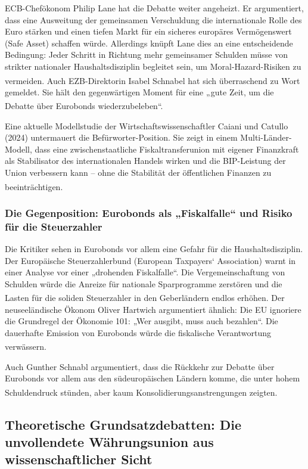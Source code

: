 \documentclass[12pt,a4paper]{article}
\newcommand{\footcite}[1]{\textsuperscript{\cite{#1}}}
\begin{document}
	ECB-Chefökonom Philip Lane hat die Debatte weiter angeheizt. Er argumentiert, dass eine Ausweitung der gemeinsamen Verschuldung die internationale Rolle des Euro stärken und einen tiefen Markt für ein sicheres europäres Vermögenswert (Safe Asset) schaffen würde. Allerdings knüpft Lane dies an eine entscheidende Bedingung: Jeder Schritt in Richtung mehr gemeinsamer Schulden müsse von strikter nationaler Haushaltsdisziplin begleitet sein, um Moral-Hazard-Risiken zu vermeiden.\footcite{Lane2026} Auch EZB-Direktorin Isabel Schnabel hat sich überraschend zu Wort gemeldet. Sie hält den gegenwärtigen Moment für eine „gute Zeit, um die Debatte über Eurobonds wiederzubeleben“.\footcite{Schnabl2025b}
	
	Eine aktuelle Modellstudie der Wirtschaftswissenschaftler Caiani und Catullo (2024) untermauert die Befürworter-Position. Sie zeigt in einem Multi-Länder-Modell, dass eine zwischenstaatliche Fiskaltransferunion mit eigener Finanzkraft als Stabilisator des internationalen Handels wirken und die BIP-Leistung der Union verbessern kann – ohne die Stabilität der öffentlichen Finanzen zu beeinträchtigen.\footcite{Caiani2024}
	
	\subsubsection{Die Gegenposition: Eurobonds als „Fiskalfalle“ und Risiko für die Steuerzahler}
	
	Die Kritiker sehen in Eurobonds vor allem eine Gefahr für die Haushaltsdisziplin. Der Europäische Steuerzahlerbund (European Taxpayers‘ Association) warnt in einer Analyse vor einer „drohenden Fiskalfalle“. Die Vergemeinschaftung von Schulden würde die Anreize für nationale Sparprogramme zerstören und die Lasten für die soliden Steuerzahler in den Geberländern endlos erhöhen.\footcite{Taxpayers2026} Der neuseeländische Ökonom Oliver Hartwich argumentiert ähnlich: Die EU ignoriere die Grundregel der Ökonomie 101: „Wer ausgibt, muss auch bezahlen“. Die dauerhafte Emission von Eurobonds würde die fiskalische Verantwortung verwässern.\footcite{Hartwich2026}
	
	Auch Gunther Schnabl argumentiert, dass die Rückkehr zur Debatte über Eurobonds vor allem aus den südeuropäischen Ländern komme, die unter hohem Schuldendruck stünden, aber kaum Konsolidierungsanstrengungen zeigten.\footcite{Schnabl2025a}
	
	\subsection{Theoretische Grundsatzdebatten: Die unvollendete Währungsunion aus wissenschaftlicher Sicht}
	
\end{document}
